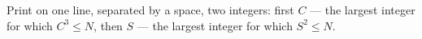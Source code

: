Print on one line, separated by a space, two integers: first $C$ --- the largest integer for which $C^3 \le N$, then $S$ --- the largest integer for which $S^2 \le N$.
